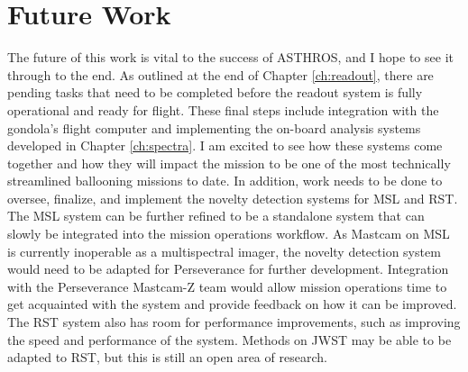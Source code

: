 \section{Future Work}
The future of this work is vital to the success of ASTHROS, and I hope to see it through to the end.
As outlined at the end of Chapter \ref{ch:readout}, there are pending tasks that need to be completed before the readout system is fully operational and ready for flight.
These final steps include integration with the gondola's flight computer and implementing the on-board analysis systems developed in Chapter \ref{ch:spectra}.
I am excited to see how these systems come together and how they will impact the mission to be one of the most technically streamlined ballooning missions to date.
In addition, work needs to be done to oversee, finalize, and implement the novelty detection systems for MSL and RST.
The MSL system can be further refined to be a standalone system that can slowly be integrated into the mission operations workflow.
As Mastcam on MSL is currently inoperable as a multispectral imager, the novelty detection system would need to be adapted for Perseverance for further development.
Integration with the Perseverance Mastcam-Z team would allow mission operations time to get acquainted with the system and provide feedback on how it can be improved.
The RST system also has room for performance improvements, such as improving the speed and performance of the system.
Methods on JWST may be able to be adapted to RST, but this is still an open area of research.

